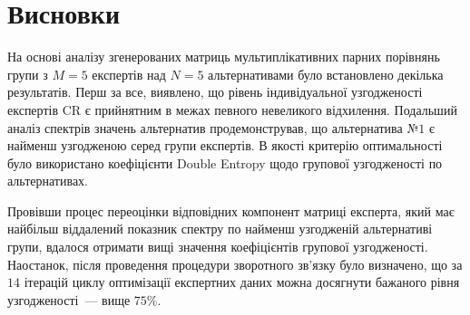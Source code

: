\documentclass{mathreport}
\begin{document}
\section*{Висновки}

На основі аналізу згенерованих матриць мультиплікативних парних порівнянь групи з $M=5$ експертів над $N=5$ альтернативами було встановлено декілька результатів. Перш за все, виявлено, що рівень індивідуальної узгодженості експертів CR є прийнятним в межах певного невеликого відхилення. Подальший аналіз спектрів значень альтернатив продемонстрував, що альтернатива №$1$ є найменш узгодженою серед групи експертів. В якості критерію оптимальності було використано коефіцієнти Double Entropy щодо групової узгодженості по альтернативах. 

Провівши процес переоцінки відповідних компонент матриці експерта, який має найбільш віддалений показник спектру по найменш узгодженій альтернативі групи, вдалося отримати вищі значення коефіцієнтів групової узгодженості. Наостанок, після проведення процедури зворотного зв'язку було визначено, що за $14$ ітерацій циклу оптимізації експертних даних можна досягнути бажаного рівня узгодженості~--- вище $75\%$.  

\newpage
\printbibliography[title={Перелік посилань}] %
\end{document}
